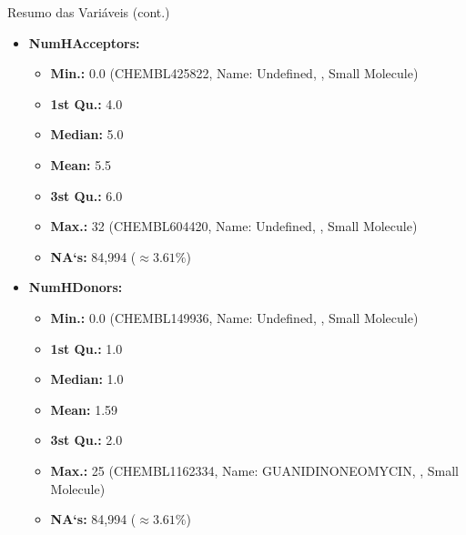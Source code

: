 \documentclass[8pt]{beamer}
\begin{document}
\begin{frame}{Resumo das Variáveis (cont.)}
\begin{multicols}{2}
  \begin{itemize}
         \item \textbf{NumHAcceptors:}
    \begin{itemize}
        \item \textbf{Min.:} 0.0 (CHEMBL425822, Name: Undefined,  , Small Molecule)
        \item \textbf{1st Qu.:} 4.0
        \item \textbf{Median:} 5.0
        \item \textbf{Mean:} 5.5
        \item \textbf{3st Qu.:} 6.0
        \item \textbf{Max.:} 32 (CHEMBL604420, Name: Undefined, , Small Molecule)
        \item \textbf{NA`s:} 84,994 ($\approx 3.61\% $)
    \end{itemize}
    \columnbreak
    \item \textbf{NumHDonors:}
    \begin{itemize}
        \item \textbf{Min.:} 0.0 (CHEMBL149936, Name: Undefined,  , Small Molecule)
        \item \textbf{1st Qu.:} 1.0
        \item \textbf{Median:} 1.0
        \item \textbf{Mean:} 1.59
        \item \textbf{3st Qu.:} 2.0
        \item \textbf{Max.:} 25 (CHEMBL1162334, Name: GUANIDINONEOMYCIN, , Small Molecule)
        \item \textbf{NA`s:} 84,994 ($\approx 3.61\% $)
    \end{itemize}
  \end{itemize}
  \end{multicols}
\end{frame}
\end{document}
